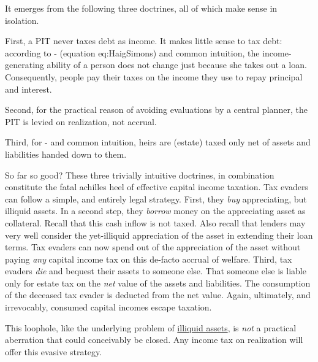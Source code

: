 It emerges from the following three doctrines, all of which make sense in isolation.


First, a PIT never taxes debt as income.
It makes little sense to tax debt:
according to \citeauthor{Haig1921}-\citeauthor{Simons1938} (equation {eq:HaigSimons}) and common intuition, the income-generating ability of a person does not change just because she takes out a loan.
Consequently, people pay their taxes on the income they use to repay principal and interest.

Second, for the practical reason of avoiding evaluations by a central planner, the PIT is levied on realization, not accrual.

Third, for \citeauthor{Haig1921}-\citeauthor{Simons1938} and common intuition, heirs are (estate) taxed only net of assets and liabilities handed down to them.

So far so good?
These three trivially intuitive doctrines, in combination constitute the fatal achilles heel of effective capital income taxation.
Tax evaders can follow a simple, and entirely legal strategy.
First, they \emph{buy} appreciating, but illiquid assets.
In a second step, they \emph{borrow} money on the appreciating asset as collateral.
Recall that this cash inflow is not taxed.
Also recall that lenders may very well consider the yet-illiquid appreciation of the asset in extending their loan terms.
Tax evaders can now spend out of the appreciation of the asset without paying \emph{any} capital income tax on this de-facto accrual of welfare.
Third, tax evaders \emph{die} and bequest their assets to someone else.
That someone else is liable only for estate tax on the \emph{net} value of the assets and liabilities.
The consumption of the deceased tax evader is deducted from the net value.
Again, ultimately, and irrevocably, consumed capital incomes escape taxation.

This loophole, like the underlying problem of \hyperref[sec:TaxIlliquid]{illiquid assets}, is \emph{not} a practical aberration that could conceivably be closed.
Any income tax on realization will offer this evasive strategy.

